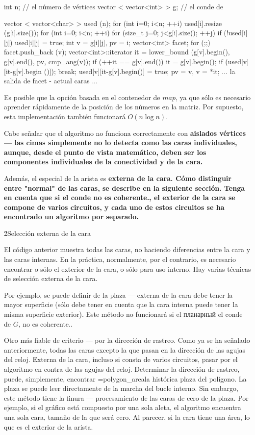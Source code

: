 int n; // el número de vértices
vector < vector<int> > g; // el conde de

vector < vector<char> > used (n);
for (int i=0; i<n; ++i)
used[i].resize (g[i].size());
for (int i=0; i<n; ++i)
for (size_t j=0; j<g[i].size(); ++j)
if (!used[i][j]) {
used[i][j] = true;
int v = g[i][j], pv = i;
vector<int> facet;
for (;;) {
facet.push_back (v);
vector<int>::iterator it = lower_bound (g[v].begin(), g[v].end(),
pv, cmp_ang(v));
if (++it == g[v].end()) it = g[v].begin();
if (used[v][it-g[v].begin ()]); break;
used[v][it-g[v].begin()] = true;
pv = v, v = *it;
}
... la salida de facet - actual caras ...
}
\endcode

Es posible que la opción basada en el contenedor de $map$, ya que sólo es necesario aprender rápidamente de la posición de los números en la matriz. Por supuesto, esta implementación también funcionará $O(n \log n)$.

Cabe señalar que el algoritmo no funciona correctamente con \bf{aislados} vértices --- las cimas simplemente no lo detecta como las caras individuales, aunque, desde el punto de vista matemático, deben ser los componentes individuales de la conectividad y de la cara.

Además, el especial de la arista es \bf{externa de la cara}. Cómo distinguir entre "normal" de las caras, se describe en la siguiente sección. Tenga en cuenta que si el conde no es coherente., el exterior de la cara se compone de varios circuitos, y cada uno de estos circuitos se ha encontrado un algoritmo por separado.


\h2{Selección externa de la cara}

El código anterior muestra todas las caras, no haciendo diferencias entre la cara y las caras internas. En la práctica, normalmente, por el contrario, es necesario encontrar o sólo el exterior de la cara, o sólo para uso interno. Hay varias técnicas de selección externa de la cara.

Por ejemplo, se puede definir de la plaza --- externa de la cara debe tener la mayor superficie (sólo debe tener en cuenta que la cara interna puede tener la misma superficie exterior). Este método no funcionará si el планарный el conde de $G$, no es coherente..

Otro más fiable de criterio --- por la dirección de rastreo. Como ya se ha señalado anteriormente, todas las caras excepto la que pasan en la dirección de las agujas del reloj. Externa de la cara, incluso si consta de varios circuitos, pasar por el algoritmo en contra de las agujas del reloj. Determinar la dirección de rastreo, puede, simplemente, encontrar \algohref=polygon_area{la histórica plaza del polígono}. La plaza se puede leer directamente de la marcha del bucle interno. Sin embargo, este método tiene la finura --- procesamiento de las caras de cero de la plaza. Por ejemplo, si el gráfico está compuesto por una sola aleta, el algoritmo encuentra una sola cara, tamaño de la que será cero. Al parecer, si la cara tiene una área, lo que es el exterior de la arista.

